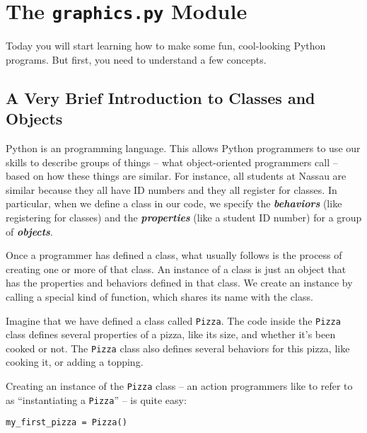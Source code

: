 
\chapter{The \texttt{graphics.py} Module}
\label{day:graphics1}


\minitoc

Today you will start learning how to make some fun, cool-looking Python programs.  But first, you need to understand a few concepts.

\section{A Very Brief Introduction to Classes and Objects}

Python is an  programming language.  This allows Python programmers to use our skills to describe groups of things -- what object-oriented programmers call  -- based on how these things are similar.  For instance, all students at Nassau are similar because they all have ID numbers and they all register for classes.  In particular, when we define a class in our code, we specify the \textbf{\textit{behaviors}} (like registering for classes) and the \textbf{\textit{properties}} (like a student ID number) for a group of \textbf{\textit{objects}}.

Once a programmer has defined a class, what usually follows is the process of creating one or more  of that class.  An instance of a class is just an object that has the properties and behaviors defined in that class.  We create an instance by calling a special kind of function, which shares its name with the class.

Imagine that we have defined a class called \texttt{Pizza}.  The code inside the \texttt{Pizza} class defines several properties of a pizza, like its size, and whether it's been cooked or not.  The \texttt{Pizza} class also defines several behaviors for this pizza, like cooking it, or adding a topping.

Creating an instance of the \texttt{Pizza} class -- an action programmers like to refer to as ``instantiating a \texttt{Pizza}'' -- is quite easy:

\begin{verbatim}
my_first_pizza = Pizza()
\end{verbatim}

